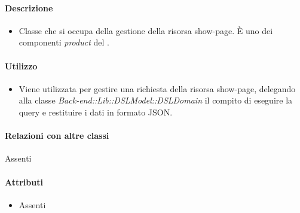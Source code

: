 \paragraph*{Descrizione}
\begin{itemize}
\item[] Classe che si occupa della gestione della risorsa show-page. È uno dei componenti \textit{product} del  .
\end{itemize}

\paragraph*{Utilizzo}
\begin{itemize}
\item[] Viene utilizzata per gestire una richiesta della risorsa show-page, delegando alla classe \textit{Back-end::Lib::DSLModel::DSLDomain} il compito di eseguire la query e restituire i dati in formato JSON.
\end{itemize}

\paragraph*{Relazioni con altre classi}
Assenti

\paragraph*{Attributi}
\begin{itemize}
\item[] Assenti
\end{itemize}

